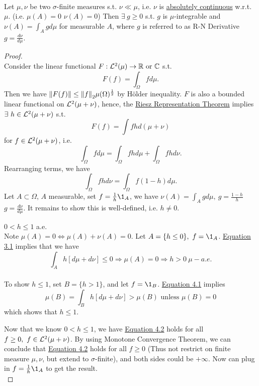\begin{theorem}\label{R-N thm}\ \\
Let $\mu,\nu$ be two $\sigma$-finite measures s.t. $\nu \ll \mu$, i.e. $\nu$ is \underline{absolutely continuous} w.r.t. $\mu$. (i.e. $\mu(A) = 0$ \imply $\nu(A) = 0$) Then $\exists\ g \geq 0$ s.t. $g$ is $\mu$-integrable and $\nu(A) = \int_A g d\mu$ for measurable $A$, where $g$ is referred to as R-N Derivative $g = \frac{d\nu}{d \mu}$.
\end{theorem}
\begin{proof}\ \\
Consider the linear functional $F: \mathcal{L}^2(\mu) \to \mathbb{R} \text{ or } \mathbb{C}$ s.t. 
\begin{equation*}
    F(f) = \int_\Omega f d\mu.
\end{equation*}
Then we have $\norm{F(f)} \leq \norm{f}_2 \mu(\Omega)^{\frac{1}{2}}$ by H\"older inequality. $F$ is also a bounded linear functional on $\mathcal{L}^2(\mu + \nu)$, hence, the \hyperref[RRT]{Riesz Representation Theorem} implies $\exists\ h \in \mathcal{L}^2(\mu+\nu)$ s.t.
$$F(f) = \int f h d(\mu+\nu)$$ 
for $f \in \mathcal{L}^2(\mu + \nu)$, i.e. 
\begin{equation}
    \int_\Omega f d\mu = \int_\Omega fh d\mu + \int_\Omega fh d\nu.\label{eq:4.1}
\end{equation} 
Rearranging terms, we have
\begin{equation}
    \int_\Omega fh d\nu = \int_\Omega f(1 - h) d\mu.\label{eq:4.2}
\end{equation} 
Let $A \subset \Omega$, $A$ measurable, set $f = \frac{1}{h} \1_A$, we have $\nu(A) = \int_A  g d\mu,\ g = \frac{1-h}{h}$ \imply $g = \frac{d\nu}{ d \mu}$. It remains to show this is well-defined, i.e. $h \neq 0$.
\begin{claim}
$0 < h \leq 1$ a.e. \\
Note $\mu(A) = 0 \Leftrightarrow \mu(A) + \nu(A) = 0$. Let $A = \{h \leq 0\},\ f = \1_A$. \hyperref[eq:3.1]{Equation 3.1} implies that we have 
\begin{equation*}
    \int_A h [d\mu + d\nu] \leq 0 \Rightarrow \mu(A) = 0 \Rightarrow h > 0\ \mu-a.e.
\end{equation*}\\
To show $h \leq 1$, set $B = \{h > 1\}$, and let $f = \1_B$. \hyperref[eq:4.1]{Equation 4.1} implies 
\begin{equation*}
    \mu(B) = \int_B h [d\mu + d\nu] > \mu(B) \text{ unless } \mu(B) = 0
\end{equation*}
which shows that $h \leq 1$.
\end{claim}
Now that we know $0 < h \leq 1$, we have \hyperref[eq:4.2]{Equation 4.2} holds for all $f \geq 0,\ f \in \mathcal{L}^2(\mu + \nu)$. By using Monotone Convergence Theorem, we can conclude that \hyperref[eq:4.2]{Equation 4.2} holds for all $f \geq 0$ (Thus not restrict on finite measure $\mu,\nu$, but extend to $\sigma$-finite), and both sides could be $+\infty$. Now can plug in $f = \frac{1}{h}\1_A$ to get the result.\\ 
\end{proof}
